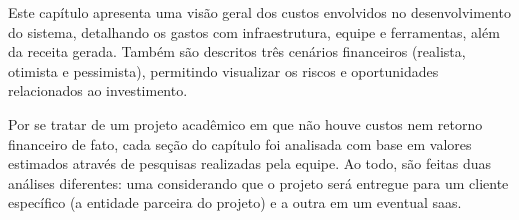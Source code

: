 
Este capítulo apresenta uma visão geral dos custos envolvidos no desenvolvimento do sistema, detalhando os gastos com infraestrutura, equipe e ferramentas, além da receita gerada. Também são descritos três cenários financeiros (realista, otimista e pessimista), permitindo visualizar os riscos e oportunidades relacionados ao investimento.

Por se tratar de um projeto acadêmico em que não houve custos nem retorno financeiro de fato, cada seção do capítulo foi analisada com base em valores estimados através de pesquisas realizadas pela equipe. Ao todo, são feitas duas análises diferentes: uma considerando que o projeto será entregue para um cliente específico (a entidade parceira do projeto) e a outra em um eventual \gls{saas}.



